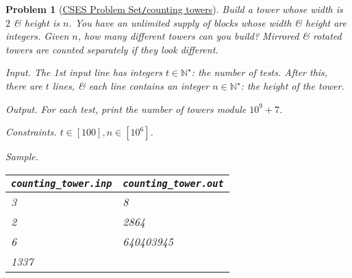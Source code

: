 \documentclass{article}
\newtheorem{problem}{Problem}
\begin{document}
\begin{problem}[\href{https://cses.fi/problemset/task/2413}{CSES Problem Set{\tt/}counting towers}]
	Build a tower whose width is $2$ \& height is $n$. You have an unlimited supply of blocks whose width \& height are integers. Given $n$, how many different towers can you build? Mirrored \& rotated towers are counted separately if they look different.
	\item {\sf Input.} The 1st input line has integers $t\in\mathbb{N}^\star$: the number of tests. After this, there are $t$ lines, \& each line contains an integer $n\in\mathbb{N}^\star$: the height of the tower.
	\item {\sf Output.} For each test, print the number of towers module $10^9 + 7$.
	\item {\sf Constraints.} $t\in[100],n\in[10^6]$.
	\item {\sf Sample.}
	\begin{table}[H]
		\centering
		\begin{tabular}{|l|l|}
			\hline
			\verb|counting_tower.inp| & \verb|counting_tower.out| \\
			\hline
			3 & 8 \\
			2 & 2864 \\
			6 & 640403945 \\
			1337 & \\
			\hline
		\end{tabular}
	\end{table}
\end{problem}
\end{document}

